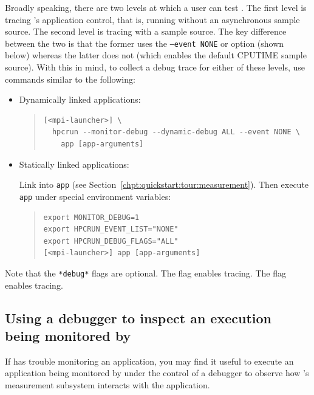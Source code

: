 \documentclass[11pt,twoside,letterpaper]{report}
\begin{document}
Broadly speaking, there are two levels at which a user can test \hpcrun{}.
The first level is tracing \hpcrun{}'s application control, that is, running \hpcrun{} without an asynchronous sample source.
The second level is tracing \hpcrun{} with a sample source.
The key difference between the two is that the former uses the \texttt{--event NONE} or  option (shown below) whereas the latter does not (which enables the default CPUTIME sample source).
With this in mind, to collect a debug trace for either of these levels, use commands similar to the following:
%
\begin{itemize}

\item Dynamically linked applications:\hfill
%
\begin{quote}
\begin{verbatim}
[<mpi-launcher>] \
  hpcrun --monitor-debug --dynamic-debug ALL --event NONE \
    app [app-arguments]
\end{verbatim}
\end{quote}

\item Statically linked applications:\hfill

Link \hpcrun{} into \texttt{app} (see Section~\ref{chpt:quickstart:tour:measurement}).
Then execute \texttt{app} under special environment variables:
\begin{quote}
\begin{verbatim}
export MONITOR_DEBUG=1
export HPCRUN_EVENT_LIST="NONE"
export HPCRUN_DEBUG_FLAGS="ALL"
[<mpi-launcher>] app [app-arguments]
\end{verbatim}
\end{quote}
\end{itemize}
%
Note that the \texttt{*debug*} flags are optional.
The  flag enables \libmonitor{} tracing.
The \mytt{--dynamic-debug/HPCRUN_DEBUG_FLAGS} flag enables \hpcrun{} tracing.



\subsection{Using a debugger to inspect an execution being monitored by \HPCToolkit{}}

If \HPCToolkit{} has trouble monitoring an application, you may find it useful to
execute an application being monitored by \HPCToolkit{} under the control
of a debugger to observe how \HPCToolkit{}'s measurement subsystem interacts with the application.
\end{document}
